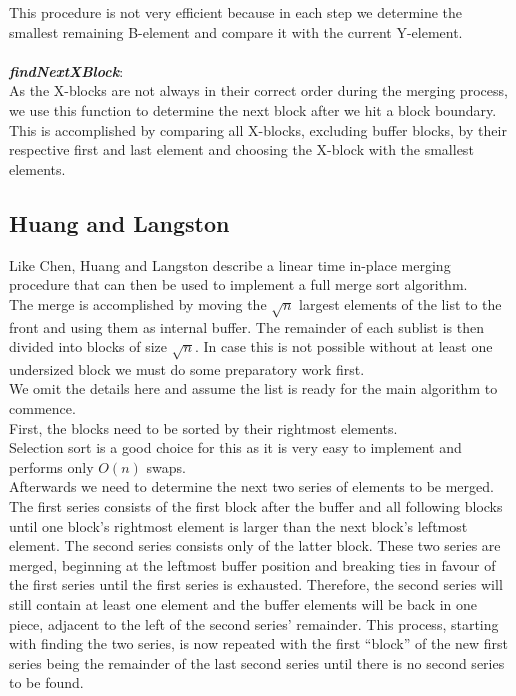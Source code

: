 \documentclass[11pt,pdftex,a4paper, twocolumn]{article}
\begin{document}
This procedure is not very efficient because in each step we determine the smallest remaining B-element and compare it with the current Y-element. \\
$ $ \\
\textbf{\textit{findNextXBlock}}: \\
As the X-blocks are not always in their correct order during the merging process, we use this function to determine the next block after we hit a block boundary. \\
This is accomplished by comparing all X-blocks, excluding buffer blocks, by their respective first and last element and choosing the X-block with the smallest elements.

\subsection*{Huang and Langston}
Like Chen, Huang and Langston describe a linear time in-place merging procedure that can then be used to implement a full merge sort algorithm. \\
The merge is accomplished by moving the $\sqrt{n}$ largest elements of the list to the front and using them as internal buffer.
The remainder of each sublist is then divided into blocks of size $\sqrt{n}$. In case this is not possible without at least one undersized block we must do some preparatory work first. \\
We omit the details here and assume the list is ready for the main algorithm to commence. \\
First, the blocks need to be sorted by their rightmost elements. \\
Selection sort is a good choice for this as it is very easy to implement and performs only $O(n)$ swaps. \\
Afterwards we need to determine the next two series of elements to be merged. \\
The first series consists of the first block after the buffer and all following blocks until one block’s rightmost element is larger than the next block’s leftmost element. The second series consists only of the latter block. These two series are merged, beginning at the leftmost buffer position and breaking ties in favour of the first series until the first series is exhausted. Therefore, the second series will still contain at least one element and the buffer elements will be back in one piece, adjacent to the left of the second series’ remainder.
This process, starting with finding the two series, is now repeated with the first “block” of the new first series being the remainder of the last second series until there is no second series to be found. \\
\end{document}
